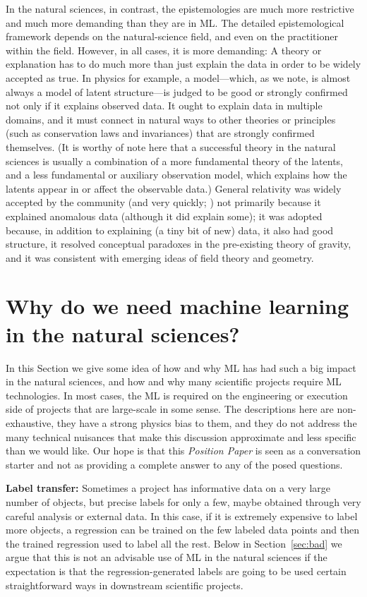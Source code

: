 \documentclass{article}
\newcommand{\documentname}{\textsl{Position Paper}}
\renewcommand{\paragraph}[1]{\noindent\par\textbf{#1}}
\newcommand{\sectionname}{Section}
\newcommand{\secref}[1]{\sectionname~\ref{#1}}
\begin{document}
In the natural sciences, in contrast, the epistemologies are much more restrictive and much more demanding than they are in ML.
The detailed epistemological framework depends on the natural-science field, and even on the practitioner within the field.
However, in all cases, it is more demanding:
A theory or explanation has to do much more than just explain the data in order to be widely accepted as true.
In physics for example, a model---which, as we note, is almost always a model of latent structure---is judged to be good or strongly confirmed not only if it explains observed data.
It ought to explain data in multiple domains, and it must connect in natural ways to other theories or principles (such as conservation laws and invariances) that are strongly confirmed themselves.
(It is worthy of note here that a successful theory in the natural sciences is usually a combination of a more fundamental theory of the latents, and a less fundamental or auxiliary observation model, which explains how the latents appear in or affect the observable data.)
General relativity \cite{gr} was widely accepted by the community (and very quickly; \citealt{peebles}) not primarily because it explained anomalous data (although it did explain some); it was adopted because, in addition to explaining (a tiny bit of new) data, it also had good structure, it resolved conceptual paradoxes in the pre-existing theory of gravity, and it was consistent with emerging ideas of field theory and geometry.

\section{Why do we need machine learning in the natural sciences?}\label{sec:why}
In this \sectionname{} we give some idea of how and why ML has had such a big impact in the natural sciences, and how and why many scientific projects require ML technologies. 
In most cases, the ML is required on the engineering or execution side of projects that are large-scale in some sense.
The descriptions here are non-exhaustive, they have a strong physics bias to them, and they do not address the many technical nuisances that make this discussion approximate and less specific than we would like.
Our hope is that this \documentname{} is seen as a conversation starter and not as providing a complete answer to any of the posed questions.  

\paragraph{Label transfer:}
Sometimes a project has informative data on a very large number of objects, but precise labels for only a few, maybe obtained through very careful analysis or external data.
In this case, if it is extremely expensive to label more objects, a regression can be trained on the few labeled data points and then the trained regression used to label all the rest.
Below in \secref{sec:bad} we argue that this is not an advisable use of ML in the natural sciences if the expectation is that the regression-generated labels are going to be used certain straightforward ways in downstream scientific projects.
\end{document}
